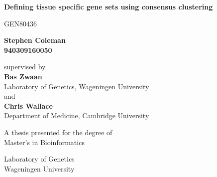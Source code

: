 \documentclass[14pt]{extarticle} %
\begin{document}
 \pgfplotsset{compat=1.15}
	
	\begin{titlepage}
		\begin{center}
			\vspace*{1cm}
			
			\par{\LARGE \textbf{Defining tissue specific gene sets using consensus clustering}}
			
			\vspace{1.25cm}
			GEN80436
			
			\vspace{1.8cm}
			
			\textbf{Stephen Coleman \\ 940309160050}
			
			\vspace{2.5cm}
			
			supervised by \\
			\textbf{Bas Zwaan} \\
			Laboratory of Genetics, Wageningen University \\
			and \\
			\textbf{Chris Wallace} \\
			Department of Medicine, Cambridge University
			

			
	
		
			\vfill		
			
			A thesis presented for the degree of\\
			Master's in Bioinformatics
			
			\vspace{1.8cm}
			
			
			Laboratory of Genetics \\
			Wageningen University
			
		\end{center}
	\end{titlepage}
	
\end{document}
